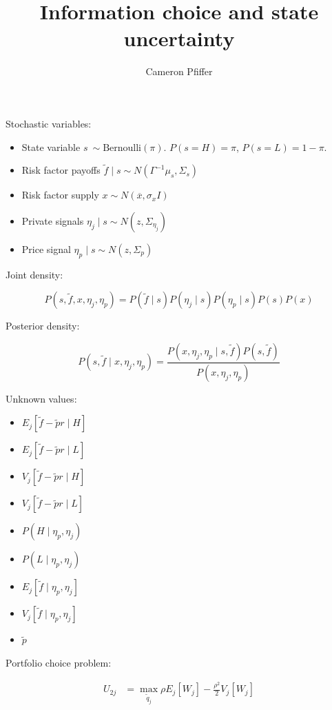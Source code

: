 \documentclass{article}
\title{Information choice and state uncertainty}
\author{Cameron Pfiffer}
\begin{document}
\newcommand{\Gauss}{\mathcal{N}}
\newcommand{\Var}{\text{Var}}
\newcommand{\E}{\text{E}}
\newcommand{\argmax}{\text{argmax}}

\newtheorem{definition}{Definition}


Stochastic variables:

\begin{itemize}
    \item State variable $s ~ \sim \text{Bernoulli}(\pi)$. $P(s=H) = \pi$, $P(s=L) = 1-\pi$.
    \item Risk factor payoffs $\tilde f \mid s \sim N(\Gamma^{-1} \mu_s, \Sigma_s)$
    \item Risk factor supply $x \sim N(\overline{x}, \sigma_x I)$
    \item Private signals $\eta_j \mid s \sim N(z, \Sigma_{\eta_j})$
    \item Price signal $\eta_p \mid s \sim N(z, \Sigma_p)$
\end{itemize}

Joint density:

$$
P(s, \tilde f, x, \eta_j, \eta_p) = P(\tilde f \mid s) P(\eta_j \mid s) P(\eta_p \mid s) P(s)  P(x)
$$

Posterior density:

$$
P(s, \tilde f \mid x, \eta_j, \eta_p) = 
    \frac{
        P(x, \eta_j, \eta_p \mid s, \tilde f) P(s, \tilde f)
    }{
        P(x, \eta_j, \eta_p)
    }
$$

Unknown values:

\begin{itemize}
    \item $E_j[\tilde f - \tilde p r \mid H]$
    \item $E_j[\tilde f - \tilde p r \mid L]$
    \item $V_j[\tilde f - \tilde p r \mid H]$
    \item $V_j[\tilde f - \tilde p r \mid L]$
    \item $P(H \mid \eta_p, \eta_j)$
    \item $P(L \mid \eta_p, \eta_j)$
    \item $E_j[\tilde f \mid \eta_p, \eta_j]$
    \item $V_j[\tilde f \mid \eta_p, \eta_j]$
    \item $\tilde p$
\end{itemize}

Portfolio choice problem:

\begin{align*}
    U_{2j} &= \max_{\tilde q_j}
        \rho E_j [W_j] - \frac{\rho^2}{2} V_j [W_j] \\
\end{align*}
\end{document}
